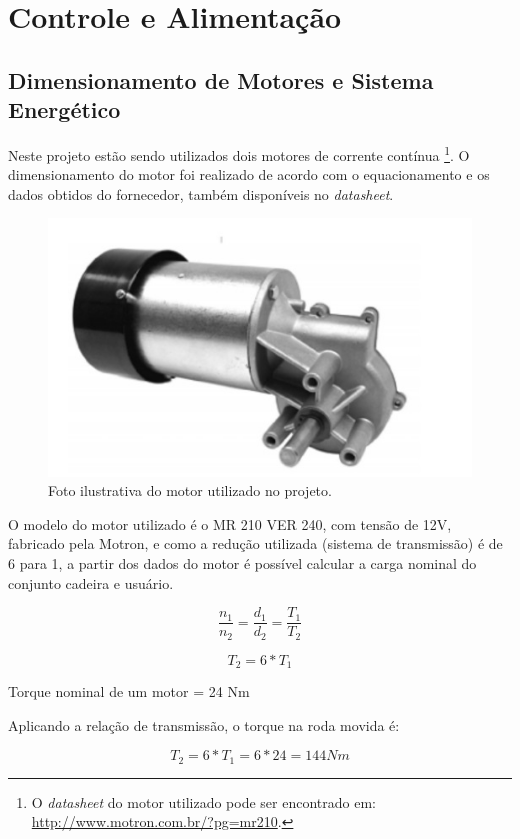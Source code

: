 \chapter{Controle e Alimentação}
\label{chapter:movimentacao}

\section{Dimensionamento de Motores e Sistema Energético}

Neste projeto estão sendo utilizados dois motores de corrente contínua
\footnote{O \textit{datasheet} do motor utilizado pode ser encontrado em:
\url{http://www.motron.com.br/?pg=mr210}.}. O dimensionamento do motor foi
realizado de acordo com o equacionamento e os dados obtidos do fornecedor,
também disponíveis no \textit{datasheet}.

\begin{figure}[h!]
  \centering
  \includegraphics{figuras/Motor.jpg}
  \caption{Foto ilustrativa do motor utilizado no projeto.}
\end{figure}

O modelo do motor utilizado é o MR 210 VER 240, com tensão de 12V, fabricado
pela Motron, e como a redução utilizada (sistema de transmissão) é de 6 para 1,
a partir dos dados do motor é possível calcular a carga nominal do conjunto
cadeira e usuário.

\[\frac{n_1}{n_2} = \frac{d_1}{d_2} = \frac{T_1}{T_2}\]

\[T_2 = 6* T_1 \]

Torque nominal de um motor = 24 Nm

Aplicando a relação de transmissão, o torque na roda movida é:

\[T_2 = 6* T_1  = 6*24 = 144 Nm\]

